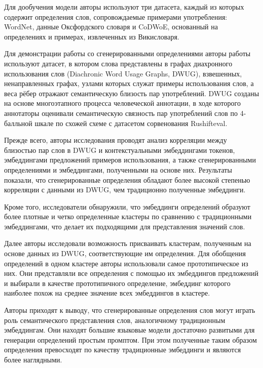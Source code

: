 \documentclass[LI,VKR]{HSEUniversity}
\begin{document}
Для дообучения модели авторы используют три датасета, каждый из которых содержит определения
слов, сопровождаемые примерами употребления: WordNet, данные Оксфордского словаря и CoDWoE,
основанный на определениях и примерах, извлеченных из Викисловаря.


Для демонстрации работы со сгенерированными определениями авторы
работы используют датасет, в котором слова представлены в графах диахронного использования
слов (Diachronic Word Usage Graphs, DWUG), взвешенных, ненаправленных графах,
узлами которых служат примеры использования слов, а веса рёбер отражают семантическую
близость пар употреблений.
DWUG созданы на основе многоэтапного процесса человеческой аннотации, в ходе которого аннотаторы
оценивали семантическую связность пар употреблений слов по 4-балльной шкале
по схожей схеме с датасетом сорвенования Rushifteval.

Прежде всего, авторы исследования проводят анализ корреляции между близостью пар слов в DWUG
и контекстуальными эмбеддингами токенов, эмбеддингами предложений примеров использования, а также
сгенерированными определениями и эмбеддингами, полученными на основе них.
Результаты показали, что сгенерированные определения обладают более высокой степенью
корреляции с данными из DWUG, чем традиционно полученные эмбеддинги.

Кроме того, исследователи обнаружили, что эмбеддинги определений образуют более плотные и четко определенные
кластеры по сравнению с традиционными эмбеддингами, что делает их
подходящими для представления значений слов.

Далее авторы исследовали возможность присваивать кластерам, полученным на основе данных из DWUG,
соответствующие им определения.
Для обобщения определений в одном кластере авторы использовали самое прототипическое из них.
Они представляли все определения с помощью их эмбеддингов предложений и выбирали в качестве
прототипичного определение, эмбеддинг которого наиболее похож на среднее значение всех
эмбеддингов в кластере.

Авторы приходят к выводу, что сгенерированные определения слов могут играть роль
семантического представления слов, аналогичному традиционным эмбеддингам.
Они находят большие языковые модели достаточно развитыми для генерации определений
простым промптом.
При этом полученные таким образом определения превосходят по качеству
традиционные эмбеддинги и являются более наглядными.
\end{document}
